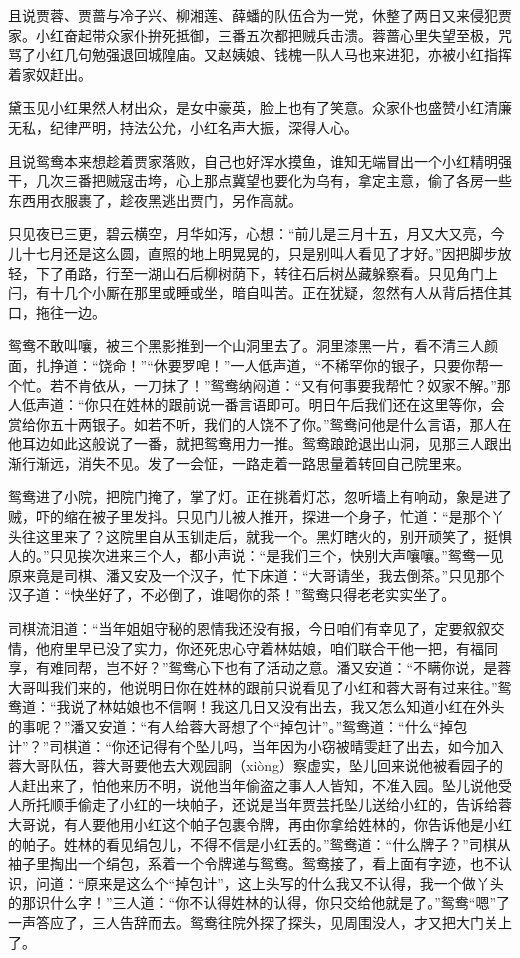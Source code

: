 \documentclass[12pt,oneside]{book}
\begin{document}
且说贾蓉、贾蔷与冷子兴、柳湘莲、薛蟠的队伍合为一党，休整了两日又来侵犯贾家。小红奋起带众家仆拚死抵御，三番五次都把贼兵击溃。蓉蔷心里失望至极，咒骂了小红几句勉强退回城隍庙。又赵姨娘、钱槐一队人马也来进犯，亦被小红指挥着家奴赶出。

黛玉见小红果然人材出众，是女中豪英，脸上也有了笑意。众家仆也盛赞小红清廉无私，纪律严明，持法公允，小红名声大振，深得人心。

且说鸳鸯本来想趁着贾家落败，自己也好浑水摸鱼，谁知无端冒出一个小红精明强干，几次三番把贼寇击垮，心上那点冀望也要化为乌有，拿定主意，偷了各房一些东西用衣服裹了，趁夜黑逃出贾门，另作高就。

只见夜已三更，碧云横空，月华如泻，心想：“前儿是三月十五，月又大又亮，今儿十七月还是这么圆，直照的地上明晃晃的，只是别叫人看见了才好。”因把脚步放轻，下了甬路，行至一湖山石后柳树荫下，转往石后树丛藏躲察看。只见角门上闩，有十几个小厮在那里或睡或坐，暗自叫苦。正在犹疑，忽然有人从背后捂住其口，拖往一边。

鸳鸯不敢叫嚷，被三个黑影推到一个山洞里去了。洞里漆黑一片，看不清三人颜面，扎挣道：“饶命！”“休要罗唣！”一人低声道，“不稀罕你的银子，只要你帮一个忙。若不肯依从，一刀抹了！”鸳鸯纳闷道：“又有何事要我帮忙？奴家不解。”那人低声道：“你只在姓林的跟前说一番言语即可。明日午后我们还在这里等你，会赏给你五十两银子。如若不听，我们的人饶不了你。”鸳鸯问他是什么言语，那人在他耳边如此这般说了一番，就把鸳鸯用力一推。鸳鸯踉跄退出山洞，见那三人跟出渐行渐远，消失不见。发了一会怔，一路走着一路思量着转回自己院里来。

鸳鸯进了小院，把院门掩了，掌了灯。正在挑着灯芯，忽听墙上有响动，象是进了贼，吓的缩在被子里发抖。只见门儿被人推开，探进一个身子，忙道：“是那个丫头往这里来了？这院里自从玉钏走后，就我一个。黑灯瞎火的，别开顽笑了，挺惧人的。”只见挨次进来三个人，都小声说：“是我们三个，快别大声嚷嚷。”鸳鸯一见原来竟是司棋、潘又安及一个汉子，忙下床道：“大哥请坐，我去倒茶。”只见那个汉子道：“快坐好了，不必倒了，谁喝你的茶！”鸳鸯只得老老实实坐了。

司棋流泪道：“当年姐姐守秘的恩情我还没有报，今日咱们有幸见了，定要叙叙交情，他府里早已没了实力，你还死忠心守着林姑娘，咱们联合干他一把，有福同享，有难同帮，岂不好？”鸳鸯心下也有了活动之意。潘又安道：“不瞒你说，是蓉大哥叫我们来的，他说明日你在姓林的跟前只说看见了小红和蓉大哥有过来往。”鸳鸯道：“我说了林姑娘也不信啊！我这几日又没有出去，我又怎么知道小红在外头的事呢？”潘又安道：“有人给蓉大哥想了个“掉包计”。”鸳鸯道：“什么“掉包计”？”司棋道：“你还记得有个坠儿吗，当年因为小窃被晴雯赶了出去，如今加入蓉大哥队伍，蓉大哥要他去大观园詗（xiòng）察虚实，坠儿回来说他被看园子的人赶出来了，怕他来历不明，说他当年偷盗之事人人皆知，不准入园。坠儿说他受人所托顺手偷走了小红的一块帕子，还说是当年贾芸托坠儿送给小红的，告诉给蓉大哥说，有人要他用小红这个帕子包裹令牌，再由你拿给姓林的，你告诉他是小红的帕子。姓林的看见绢包儿，不得不信是小红丢的。”鸳鸯道：“什么牌子？”司棋从袖子里掏出一个绢包，系着一个令牌递与鸳鸯。鸳鸯接了，看上面有字迹，也不认识，问道：“原来是这么个“掉包计”，这上头写的什么我又不认得，我一个做丫头的那识什么字！”三人道：“你不认得姓林的认得，你只交给他就是了。”鸳鸯“嗯”了一声答应了，三人告辞而去。鸳鸯往院外探了探头，见周围没人，才又把大门关上了。
\end{document}
